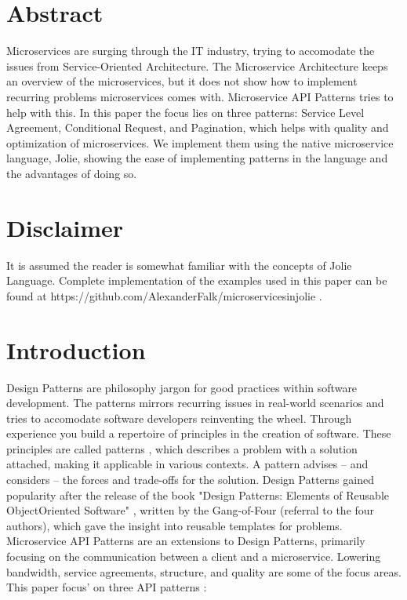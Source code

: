 \documentclass[12pt]{article}
\begin{document}

\tableofcontents
\newpage


\section{Abstract}
Microservices are surging through the IT industry, trying to accomodate the issues from Service-Oriented Architecture. The Microservice Architecture keeps an overview of the microservices, but it does not show how to implement recurring problems microservices comes with. Microservice API Patterns tries to help with this. In this paper the focus lies on three patterns: Service Level Agreement, Conditional Request, and Pagination, which helps with quality and optimization of microservices. We implement them using the native microservice language, Jolie, showing the ease of implementing patterns in the language and the advantages of doing so.

\section{Disclaimer}
It is assumed the reader is somewhat familiar with the concepts of Jolie Language. Complete implementation of the examples used in this paper can be found at https://github.com/AlexanderFalk/microservicesinjolie .

\newpage

\section{Introduction}
Design Patterns are philosophy jargon for good practices within software development. The patterns mirrors recurring issues in real-world scenarios and tries to accomodate software developers reinventing the wheel. Through experience you build a repertoire of principles in the creation of software. These principles are called patterns \cite{Applying_Patterns}, which describes a problem with a solution attached, making it applicable in various contexts. A pattern advises -- and considers -- the forces and trade-offs for the solution. Design Patterns gained popularity after the release of the book "Design Patterns: Elements of Reusable Object\-Oriented Software" \cite{DesignPGoF}, written by the Gang-of-Four (referral to the four authors), which gave the insight into reusable templates for problems. Microservice API Patterns are an extensions to Design Patterns, primarily focusing on the communication between a client and a microservice. Lowering bandwidth, service agreements, structure, and quality are some of the focus areas. \\
This paper focus' on three API patterns \cite{MAPIPweb}: 
\end{document}
